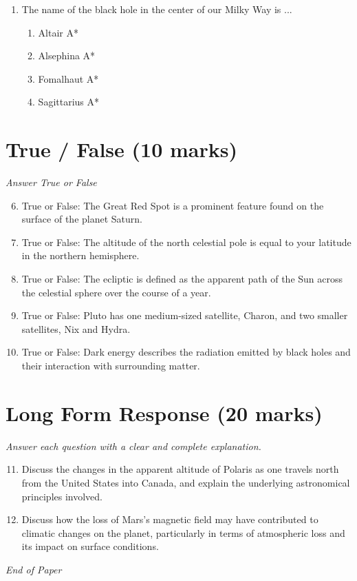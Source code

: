 \documentclass[12pt]{article}
\begin{document}
\begin{enumerate}[label=\arabic*.]
\begin{enumerate}[label=(\alph*)]
    \item hydrogen compounds (H$_{2}$OCH$_{4}$NH$_{3}$) light gases (H He) metals rocks
    \item hydrogen compounds (H$_{2}$OCH$_{4}$NH$_{3}$) light gases (H He) rocks metals
    \item light gases (H He) hydrogen compounds (H$_{2}$OCH$_{4}$NH$_{3}$) metals rocks
    \item light gases (H He) hydrogen compounds (H$_{2}$OCH$_{4}$NH$_{3}$) rocks metals
\end{enumerate}
\item The name of the black hole in the center of our Milky Way is ...
\begin{enumerate}[label=(\alph*)]
    \item Altair A*
    \item Alsephina A*
    \item Fomalhaut A*
    \item Sagittarius A*
\end{enumerate}
\end{enumerate}

\section*{True / False (10 marks)}
\textit{Answer True or False}
\begin{enumerate}[label=\arabic*.]
\setcounter{enumi}{5}
\item True or False: The Great Red Spot is a prominent feature found on the surface of the planet Saturn.
\item True or False: The altitude of the north celestial pole is equal to your latitude in the northern hemisphere.
\item True or False: The ecliptic is defined as the apparent path of the Sun across the celestial sphere over the course of a year.
\item True or False: Pluto has one medium-sized satellite, Charon, and two smaller satellites, Nix and Hydra.
\item True or False: Dark energy describes the radiation emitted by black holes and their interaction with surrounding matter.
\end{enumerate}

\section*{Long Form Response (20 marks)}
\textit{Answer each question with a clear and complete explanation.}
\begin{enumerate}[label=\arabic*.]
\setcounter{enumi}{10}
\item Discuss the changes in the apparent altitude of Polaris as one travels north from the United States into Canada, and explain the underlying astronomical principles involved.
\item Discuss how the loss of Mars's magnetic field may have contributed to climatic changes on the planet, particularly in terms of atmospheric loss and its impact on surface conditions.
\end{enumerate}

\vfill
\noindent\textit{End of Paper}
\end{document}
